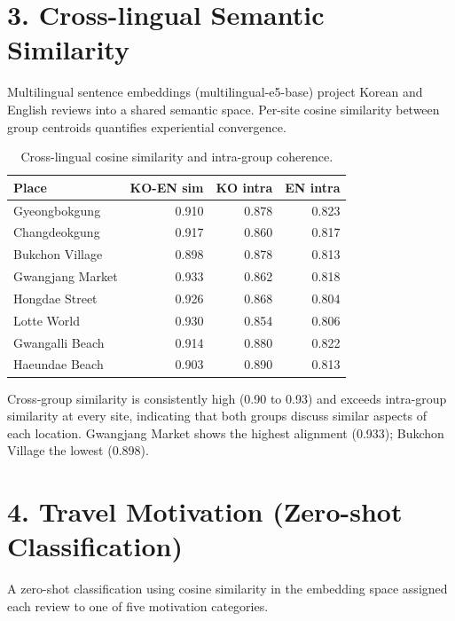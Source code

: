 \documentclass[11pt,a4paper]{article}
\begin{document}
\section*{3. Cross-lingual Semantic Similarity}

Multilingual sentence embeddings (multilingual-e5-base) project Korean and
English reviews into a shared semantic space. Per-site cosine similarity
between group centroids quantifies experiential convergence.

\begin{table}[H]
\centering
\small
\begin{tabular}{lRRR}
\toprule
\textbf{Place} & \textbf{KO-EN sim} & \textbf{KO intra} & \textbf{EN intra} \\
\midrule
Gyeongbokgung    & 0.910 & 0.878 & 0.823 \\
Changdeokgung    & 0.917 & 0.860 & 0.817 \\
Bukchon Village  & 0.898 & 0.878 & 0.813 \\
Gwangjang Market & 0.933 & 0.862 & 0.818 \\
Hongdae Street   & 0.926 & 0.868 & 0.804 \\
Lotte World      & 0.930 & 0.854 & 0.806 \\
Gwangalli Beach  & 0.914 & 0.880 & 0.822 \\
Haeundae Beach   & 0.903 & 0.890 & 0.813 \\
\bottomrule
\end{tabular}
\caption{Cross-lingual cosine similarity and intra-group coherence.}
\end{table}

Cross-group similarity is consistently high (0.90 to 0.93) and exceeds
intra-group similarity at every site, indicating that both groups discuss
similar aspects of each location. Gwangjang Market shows the highest
alignment (0.933); Bukchon Village the lowest (0.898).

\section*{4. Travel Motivation (Zero-shot Classification)}

A zero-shot classification using cosine similarity in the embedding space
assigned each review to one of five motivation categories.
\end{document}
